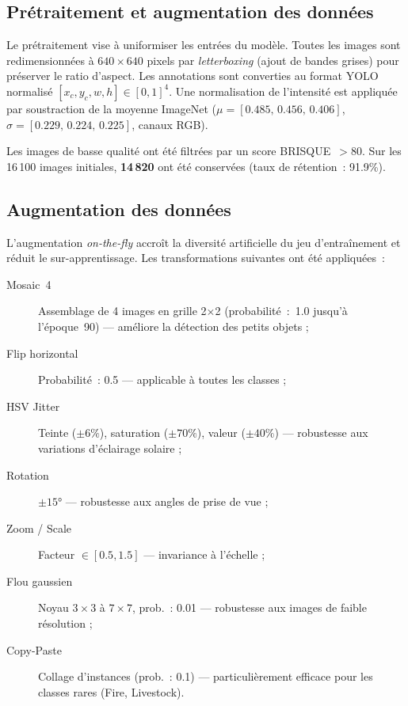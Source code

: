 \subsection{Prétraitement et augmentation des données}

Le prétraitement vise à uniformiser les entrées du modèle. Toutes les images sont
redimensionnées à $640\times640$ pixels par \textit{letterboxing} (ajout de bandes
grises) pour préserver le ratio d'aspect. Les annotations sont converties au format
YOLO normalisé $[x_c, y_c, w, h] \in [0,1]^4$. Une normalisation de l'intensité est
appliquée par soustraction de la moyenne ImageNet
($\mu = [0.485,\,0.456,\,0.406]$, $\sigma = [0.229,\,0.224,\,0.225]$, canaux RGB).

Les images de basse qualité ont été filtrées par un score BRISQUE~$> 80$. Sur les
16\,100 images initiales, \textbf{14\,820} ont été conservées (taux de rétention~: 91.9\%).

\subsection{Augmentation des données}

L'augmentation \textit{on-the-fly} accroît la diversité artificielle du jeu
d'entraînement et réduit le sur-apprentissage. Les transformations suivantes
ont été appliquées~:

\begin{description}
  \item[Mosaic~4] Assemblage de 4 images en grille 2$\times$2 (probabilité~:~1.0
        jusqu'à l'époque~90) --- améliore la détection des petits objets ;
  \item[Flip horizontal] Probabilité~: 0.5 --- applicable à toutes les classes ;
  \item[HSV Jitter] Teinte ($\pm6\%$), saturation ($\pm70\%$), valeur ($\pm40\%$)
        --- robustesse aux variations d'éclairage solaire ;
  \item[Rotation] $\pm15°$ --- robustesse aux angles de prise de vue ;
  \item[Zoom / Scale] Facteur $\in [0.5, 1.5]$ --- invariance à l'échelle ;
  \item[Flou gaussien] Noyau $3\times3$ à $7\times7$, prob.~: 0.01 --- robustesse
        aux images de faible résolution ;
  \item[Copy-Paste] Collage d'instances (prob.~: 0.1) --- particulièrement efficace
        pour les classes rares (Fire, Livestock).
\end{description}

